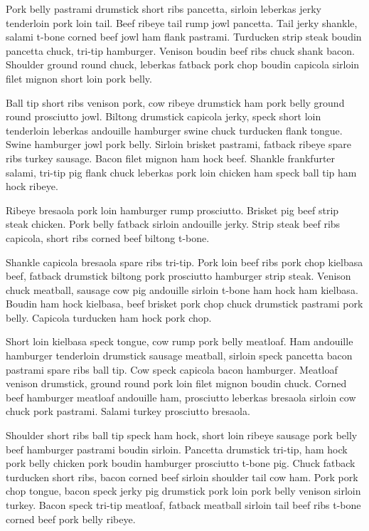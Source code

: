 Pork belly pastrami drumstick short ribs pancetta, sirloin leberkas jerky tenderloin pork loin tail. Beef ribeye tail rump jowl pancetta. Tail jerky shankle, salami t-bone corned beef jowl ham flank pastrami. Turducken strip steak boudin pancetta chuck, tri-tip hamburger. Venison boudin beef ribs chuck shank bacon. Shoulder ground round chuck, leberkas fatback pork chop boudin capicola sirloin filet mignon short loin pork belly.

Ball tip short ribs venison pork, cow ribeye drumstick ham pork belly ground round prosciutto jowl. Biltong drumstick capicola jerky, speck short loin tenderloin leberkas andouille hamburger swine chuck turducken flank tongue. Swine hamburger jowl pork belly. Sirloin brisket pastrami, fatback ribeye spare ribs turkey sausage. Bacon filet mignon ham hock beef. Shankle frankfurter salami, tri-tip pig flank chuck leberkas pork loin chicken ham speck ball tip ham hock ribeye.

Ribeye bresaola pork loin hamburger rump prosciutto. Brisket pig beef strip steak chicken. Pork belly fatback sirloin andouille jerky. Strip steak beef ribs capicola, short ribs corned beef biltong t-bone.

Shankle capicola bresaola spare ribs tri-tip. Pork loin beef ribs pork chop kielbasa beef, fatback drumstick biltong pork prosciutto hamburger strip steak. Venison chuck meatball, sausage cow pig andouille sirloin t-bone ham hock ham kielbasa. Boudin ham hock kielbasa, beef brisket pork chop chuck drumstick pastrami pork belly. Capicola turducken ham hock pork chop.

Short loin kielbasa speck tongue, cow rump pork belly meatloaf. Ham andouille hamburger tenderloin drumstick sausage meatball, sirloin speck pancetta bacon pastrami spare ribs ball tip. Cow speck capicola bacon hamburger. Meatloaf venison drumstick, ground round pork loin filet mignon boudin chuck. Corned beef hamburger meatloaf andouille ham, prosciutto leberkas bresaola sirloin cow chuck pork pastrami. Salami turkey prosciutto bresaola.

Shoulder short ribs ball tip speck ham hock, short loin ribeye sausage pork belly beef hamburger pastrami boudin sirloin. Pancetta drumstick tri-tip, ham hock pork belly chicken pork boudin hamburger prosciutto t-bone pig. Chuck fatback turducken short ribs, bacon corned beef sirloin shoulder tail cow ham. Pork pork chop tongue, bacon speck jerky pig drumstick pork loin pork belly venison sirloin turkey. Bacon speck tri-tip meatloaf, fatback meatball sirloin tail beef ribs t-bone corned beef pork belly ribeye.

